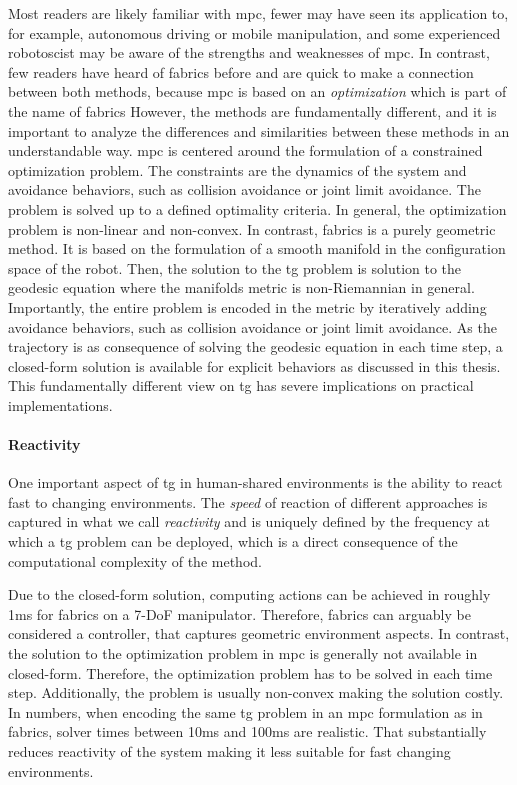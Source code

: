 Most readers are likely familiar with \acl{mpc}, fewer may have seen its application
to, for example, autonomous driving or mobile manipulation, and some 
experienced robotoscist may be aware of the strengths and weaknesses of
\ac{mpc}. In contrast, few readers have heard of \ac{fabrics} before and are 
quick to make a connection between both methods, because
\ac{mpc} is based on an \textit{optimization} which is part
of the name of \acf{fabrics}
However, the methods are
fundamentally different,
and it is important to analyze the differences and similarities between
these methods in an understandable way.
\ac{mpc} is centered around the
formulation of a constrained optimization problem. The constraints are
the dynamics of the system and avoidance behaviors, such as collision avoidance
or joint limit avoidance. The problem is solved up to a defined optimality 
criteria. In general, the optimization problem is non-linear and non-convex.
In contrast, \ac{fabrics} is a purely geometric method. It is based on the
formulation of a smooth manifold in the configuration space of the robot.
Then, the solution to the \ac{tg} problem is solution to the geodesic equation
where the manifolds metric is non-Riemannian in general. Importantly, the entire
problem is encoded in the metric by iteratively adding avoidance
behaviors, such as collision avoidance or joint limit avoidance. As the
trajectory is as consequence of solving the geodesic equation in each time step, a
closed-form solution is available for explicit behaviors as discussed in this
thesis.
This fundamentally different view on \ac{tg} has severe implications on
practical implementations.

\paragraph{Reactivity}
\label{par:discussion_reactivity}

One important aspect of \ac{tg} in human-shared environments is the ability to
react fast to changing environments. The \textit{speed} of reaction
of different approaches is captured in what we call
\textit{reactivity} and is uniquely defined by the frequency
at which a \ac{tg} problem can be deployed, which is a
direct consequence of the computational complexity of the
method.

Due to the closed-form solution, computing actions can be
achieved in roughly 1ms for \ac{fabrics} on a 7-DoF
manipulator. Therefore, \ac{fabrics} can arguably be
considered a controller, that captures geometric environment
aspects. In contrast, the solution to the optimization
problem in \ac{mpc} is generally not available in
closed-form. Therefore, the optimization problem has to be 
solved in each time step. Additionally, the problem is
usually non-convex making the solution costly. In numbers,
when encoding the same \ac{tg} problem in an \ac{mpc}
formulation as in \ac{fabrics}, solver times between 10ms
and 100ms are realistic. That substantially reduces
reactivity of the system making it less suitable for fast
changing environments.

